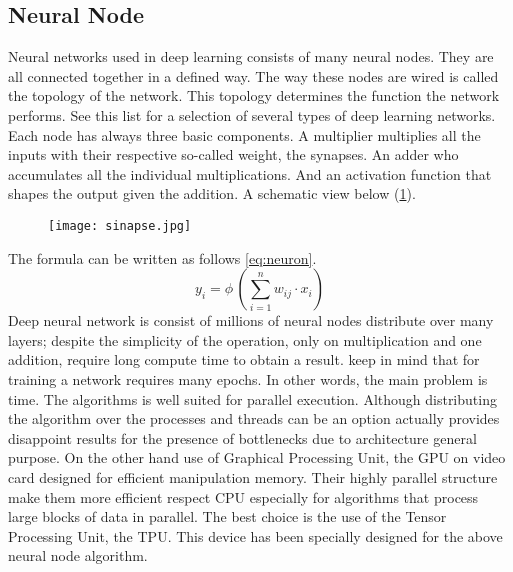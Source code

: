 \subsection{Neural Node}
\label{ssec:hard-neural-node}
Neural networks used in deep learning consists of many neural nodes.  They are
all connected together in a defined way. The way these nodes are wired  is
called the topology of the network.  This topology determines the function the
network performs. See this list for a  selection of several types of deep
learning networks. Each node has always three basic components. 
A multiplier multiplies all the  inputs with their respective so-called weight,
the synapses. An adder who accumulates all the individual multiplications.  And
an activation function that shapes the output given the addition. A schematic
view below (\ref{fig:neuron}).\hfill \break
%
\begin{figure}[htb]
	\centering
    \texttt{[image: sinapse.jpg]}
    \label{fig:neuron}
\end{figure}
%
\newpage
\noindent The formula can be written as follows \eqref{eq:neuron}.
\begin{equation}
\label{eq:neuron}
	y_{i} = \phi \, \left(\sum_{i=1}^{n} w_{ij}\cdot x_{i} \right)
\end{equation}
%
Deep neural network is consist of millions of neural nodes distribute over many
layers; despite the simplicity of the operation, only on multiplication and one
addition, require long compute time to obtain a result. keep in mind that for
training a network requires many epochs. In other words, the main problem is
time. The algorithms is well suited for parallel execution. Although
distributing  the algorithm over the processes and threads can be an option
actually  provides disappoint results for the presence of bottlenecks due to
architecture general purpose. On the other hand use of Graphical Processing
Unit,  the GPU on video card designed for efficient manipulation memory. Their
highly parallel structure make them more efficient respect CPU especially for
algorithms that process large blocks of data in parallel. The best choice is the
use of the Tensor Processing Unit, the TPU. This device has been specially
designed for the above neural node algorithm.
%
